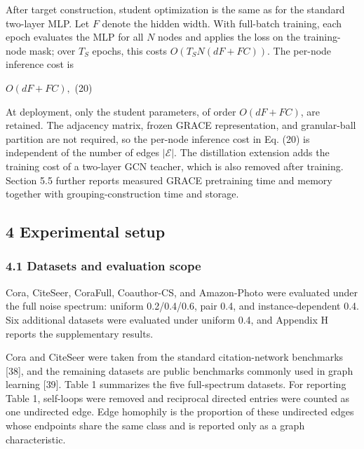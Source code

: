 After target construction, student optimization is the same as for the standard two-layer MLP. Let \(F\) denote the hidden width. With full-batch training, each epoch evaluates the MLP for all \(N\) nodes and applies the loss on the training-node mask; over \(T_{S}\) epochs, this costs \(O(T_{S}N(dF + FC))\). The per-node inference cost is

\(O(dF + FC),\) (20)

At deployment, only the student parameters, of order \(O(dF + FC)\), are retained. The adjacency matrix, frozen GRACE representation, and granular-ball partition are not required, so the per-node inference cost in Eq. (20) is independent of the number of edges \(|\mathcal{E}|\). The distillation extension adds the training cost of a two-layer GCN teacher, which is also removed after training. Section 5.5 further reports measured GRACE pretraining time and memory together with grouping-construction time and storage.

\subsection{4 Experimental setup}\label{experimental-setup}

\subsubsection{4.1 Datasets and evaluation scope}\label{datasets-and-evaluation-scope}

Cora, CiteSeer, CoraFull, Coauthor-CS, and Amazon-Photo were evaluated under the full noise spectrum: uniform 0.2/0.4/0.6, pair 0.4, and instance-dependent 0.4. Six additional datasets were evaluated under uniform 0.4, and Appendix H reports the supplementary results.

Cora and CiteSeer were taken from the standard citation-network benchmarks {[}38{]}, and the remaining datasets are public benchmarks commonly used in graph learning {[}39{]}. Table 1 summarizes the five full-spectrum datasets. For reporting Table 1, self-loops were removed and reciprocal directed entries were counted as one undirected edge. Edge homophily is the proportion of these undirected edges whose endpoints share the same class and is reported only as a graph characteristic.

